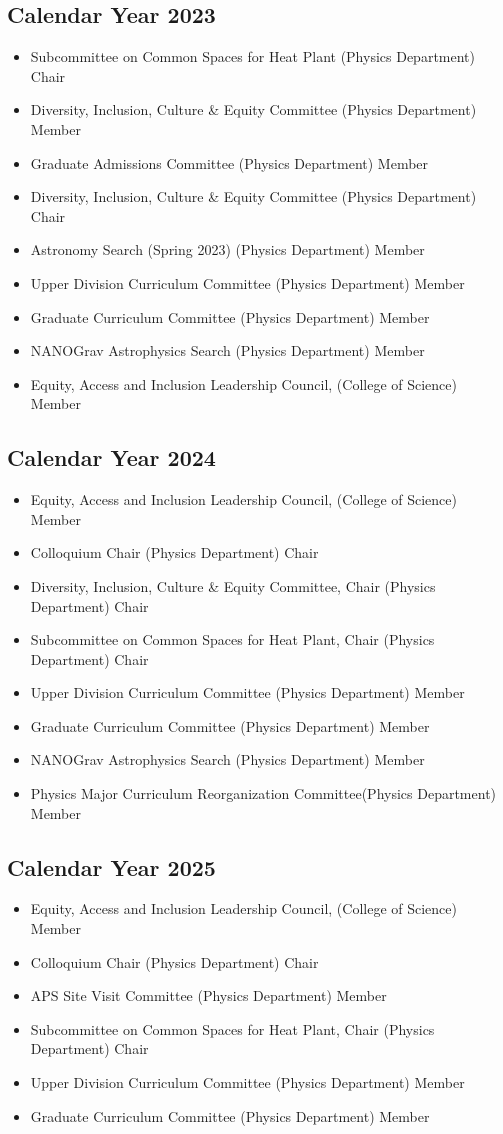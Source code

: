 \documentclass[11pt,letterpaper,sans,unicode]{moderncv}
\newcommand{\confitem}[2]{\item #1 \hfill #2} %
\begin{document}
\subsection{Calendar Year 2023}
\begin{itemize}[leftmargin=8mm]
\confitem{Subcommittee on Common Spaces for Heat Plant (Physics Department)}{Chair}
\confitem{Diversity, Inclusion, Culture \& Equity Committee (Physics Department)}{Member}
\confitem{Graduate Admissions Committee (Physics Department)}{Member}
\confitem{Diversity, Inclusion, Culture \& Equity Committee  (Physics Department)}{Chair}
\confitem{Astronomy Search (Spring 2023) (Physics Department)}{Member}
\confitem{Upper Division Curriculum Committee (Physics Department)}{Member}
\confitem{Graduate Curriculum Committee (Physics Department)}{Member}
\confitem{NANOGrav Astrophysics Search (Physics Department)}{Member}
\confitem{Equity, Access and Inclusion Leadership Council, (College of Science)}{Member}
\end{itemize}
\subsection{Calendar Year 2024}
\begin{itemize}[leftmargin=8mm]
\confitem{Equity, Access and Inclusion Leadership Council, (College of Science)}{Member}
\confitem{Colloquium Chair (Physics Department)}{Chair}
\confitem{Diversity, Inclusion, Culture \& Equity Committee, Chair (Physics Department)}{Chair}
\confitem{Subcommittee on Common Spaces for Heat Plant, Chair (Physics Department)}{Chair}
\confitem{Upper Division Curriculum Committee (Physics Department)}{Member}
\confitem{Graduate Curriculum Committee (Physics Department)}{Member}
\confitem{NANOGrav Astrophysics Search (Physics Department)}{Member}
\confitem{Physics Major Curriculum Reorganization Committee(Physics Department)}{Member}
\end{itemize}
\subsection{Calendar Year 2025}
\begin{itemize}[leftmargin=8mm]
\confitem{Equity, Access and Inclusion Leadership Council, (College of Science)}{Member}
\confitem{Colloquium Chair (Physics Department)}{Chair}
\confitem{APS Site Visit Committee (Physics Department)}{Member}
\confitem{Subcommittee on Common Spaces for Heat Plant, Chair (Physics Department)}{Chair}
\confitem{Upper Division Curriculum Committee (Physics Department)}{Member}
\confitem{Graduate Curriculum Committee (Physics Department)}{Member}
\end{itemize}
\end{document}
